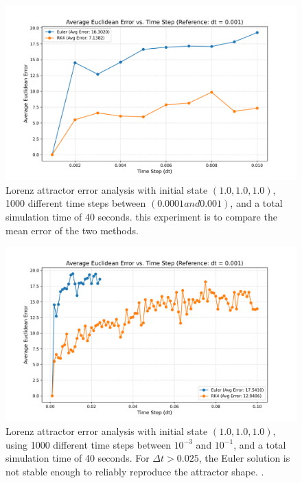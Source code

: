 \begin{figure}[!ht]
  \centering
  \includegraphics[width=0.9\linewidth]{images/error_comparison_same_times.png}
  \caption{Lorenz attractor error analysis with initial state \((1.0, 1.0, 1.0)\), 1000 different time steps between \((0.0001 and 0.001)\), and a total simulation time of 40 seconds. this experiment is to compare the mean error of the two methods\cite{youngaryanLorenzError1.1.4_image}.}
  \label{fig:error_comparison_same_times}
\end{figure}





\begin{figure}[!ht]
  \centering
  \includegraphics[width=0.9\linewidth]{images/error_comparison1000_114.png}
  \caption{Lorenz attractor error analysis with initial state \((1.0, 1.0, 1.0)\), using 1000 different time steps between \(10^{-3}\) and \(10^{-1}\), and a total simulation time of 40 seconds. For \(\Delta t > 0.025\), the Euler solution is not stable enough to reliably reproduce the attractor shape.
  \cite{youngaryanLorenzError1.1.41000_image}.}
  \label{fig:lorenz_error1000}
\end{figure}



